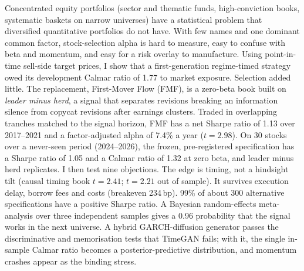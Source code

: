 Concentrated equity portfolios (sector and thematic funds, high-conviction books, systematic baskets on narrow universes) have a statistical problem that diversified quantitative portfolios do not have. With few names and one dominant common factor, stock-selection alpha is hard to measure, easy to confuse with beta and momentum, and easy for a risk overlay to manufacture. Using point-in-time sell-side target prices, I show that a first-generation regime-timed strategy owed its development Calmar ratio of 1.77 to market exposure. Selection added little. The replacement, First-Mover Flow (FMF), is a zero-beta book built on \emph{leader minus herd}, a signal that separates revisions breaking an information silence from copycat revisions after earnings clusters. Traded in overlapping tranches matched to the signal horizon, FMF has a net Sharpe ratio of 1.13 over 2017--2021 and a factor-adjusted alpha of 7.4\% a year ($t = 2.98$). On 30 stocks over a never-seen period (2024--2026), the frozen, pre-registered specification has a Sharpe ratio of 1.05 and a Calmar ratio of 1.32 at zero beta, and leader minus herd replicates. I then test nine objections. The edge is timing, not a hindsight tilt (causal timing book $t = 2.41$; $t = 2.21$ out of sample). It survives execution delay, borrow fees and costs (breakeven 234\,bp). 99\% of about 300 alternative specifications have a positive Sharpe ratio. A Bayesian random-effects meta-analysis over three independent samples gives a 0.96 probability that the signal works in the next universe. A hybrid GARCH-diffusion generator passes the discriminative and memorisation tests that TimeGAN fails; with it, the single in-sample Calmar ratio becomes a posterior-predictive distribution, and momentum crashes appear as the binding stress.
